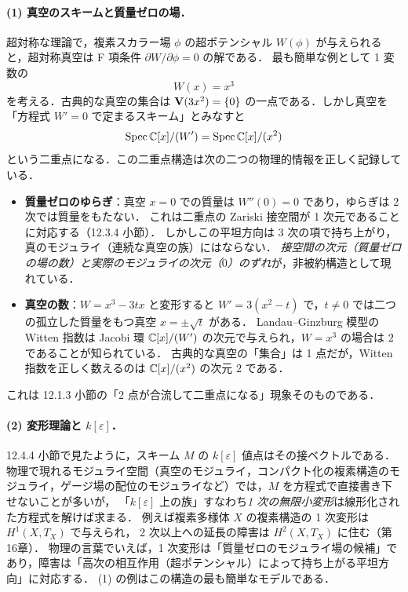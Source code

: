 \paragraph{(1) 真空のスキームと質量ゼロの場．}
超対称な理論で，複素スカラー場 $\phi$ の超ポテンシャル $W(\phi)$ が与えられると，超対称真空は F 項条件 $\partial W/\partial\phi=0$ の解である．
最も簡単な例として 1 変数の
\[
  W(x)=x^3
\]
を考える．古典的な真空の集合は $\mathbf{V}(3x^2)=\{0\}$ の一点である．しかし真空を「方程式 $W'=0$ で定まるスキーム」とみなすと
\[
  \operatorname{Spec}\mathbb{C}[x]/(W') = \operatorname{Spec}\mathbb{C}[x]/(x^2)
\]
という二重点になる．この二重点構造は次の二つの物理的情報を正しく記録している．
\begin{itemize}
  \item \textbf{質量ゼロのゆらぎ}：真空 $x=0$ での質量は $W''(0)=0$ であり，ゆらぎは 2 次では質量をもたない．
  これは二重点の Zariski 接空間が 1 次元であることに対応する（12.3.4 小節）．
  しかしこの平坦方向は 3 次の項で持ち上がり，真のモジュライ（連続な真空の族）にはならない．
  \emph{接空間の次元（質量ゼロの場の数）と実際のモジュライの次元（$0$）のずれ}が，非被約構造として現れている．
  \item \textbf{真空の数}：$W=x^3-3tx$ と変形すると $W'=3(x^2-t)$ で，$t\ne0$ では二つの孤立した質量をもつ真空 $x=\pm\sqrt t$ がある．
  Landau--Ginzburg 模型の Witten 指数は Jacobi 環 $\mathbb{C}[x]/(W')$ の次元で与えられ，$W=x^3$ の場合は $2$ であることが知られている．
  古典的な真空の「集合」は 1 点だが，Witten 指数を正しく数えるのは $\mathbb{C}[x]/(x^2)$ の次元 $2$ である．
\end{itemize}
これは 12.1.3 小節の「2 点が合流して二重点になる」現象そのものである．

\paragraph{(2) 変形理論と $k[\varepsilon]$．}
12.4.4 小節で見たように，スキーム $M$ の $k[\varepsilon]$ 値点はその接ベクトルである．
物理で現れるモジュライ空間（真空のモジュライ，コンパクト化の複素構造のモジュライ，ゲージ場の配位のモジュライなど）では，$M$ を方程式で直接書き下せないことが多いが，
「$k[\varepsilon]$ 上の族」すなわち\emph{1 次の無限小変形}は線形化された方程式を解けば求まる．
例えば複素多様体 $X$ の複素構造の 1 次変形は $H^1(X,T_X)$ で与えられ，
2 次以上への延長の障害は $H^2(X,T_X)$ に住む（第16章）．
物理の言葉でいえば，1 次変形は「質量ゼロのモジュライ場の候補」であり，障害は「高次の相互作用（超ポテンシャル）によって持ち上がる平坦方向」に対応する．
(1) の例はこの構造の最も簡単なモデルである．

